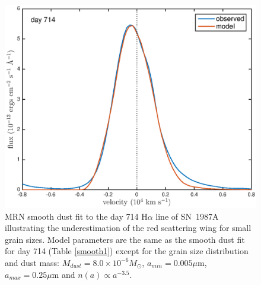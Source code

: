 \documentclass[useAMS,usenatbib,usegraphicx]{mnras}
\begin{document}
\begin{figure}
\begin{center}
\includegraphics[trim =37 10 45 15,clip=true,scale=0.51]{smooth/d714Ha_smooth_amC_MRN}
\caption{MRN smooth dust fit to the day 714 H$\alpha$ line of SN~1987A illustrating the 
underestimation of the red scattering wing for small grain sizes.  Model 
parameters are the same as the smooth dust fit for day 714 (Table \ref{smooth1}) except for the 
grain size distribution and dust mass:  $M_{dust}=8.0 \times 10^{-6} 
M_{\odot}$, $a_{min}=0.005 \mu$m, $a_{max}=0.25 \mu$m and $n(a) \propto 
a^{-3.5}$.}
\label{MRN}
\end{center}
\end{figure}
\end{document}
